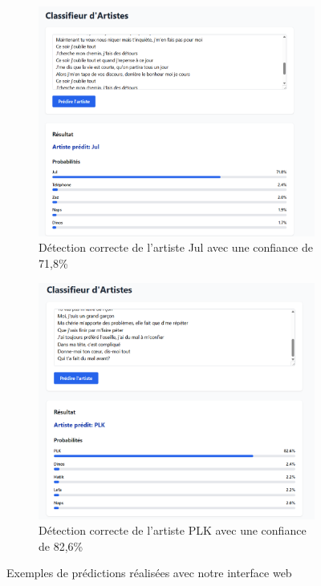\documentclass[a4paper,11pt]{article}
\begin{document}
\begin{figure}[ht]
    \centering
    \begin{subfigure}[b]{0.8\textwidth}
        \centering
        \includegraphics[width=\textwidth]{results_rapport/jul_fixed.png}
        \caption{Détection correcte de l'artiste Jul avec une confiance de 71,8\%}
        \label{fig:jul-detection}
    \end{subfigure}
    \vspace{0.5cm}
    \begin{subfigure}[b]{0.8\textwidth}
        \centering
        \includegraphics[width=\textwidth]{results_rapport/plk_fixed.png}
        \caption{Détection correcte de l'artiste PLK avec une confiance de 82,6\%}
        \label{fig:plk-detection}
    \end{subfigure}
    \caption{Exemples de prédictions réalisées avec notre interface web}
    \label{fig:web-interface}
\end{figure}
\end{document}
